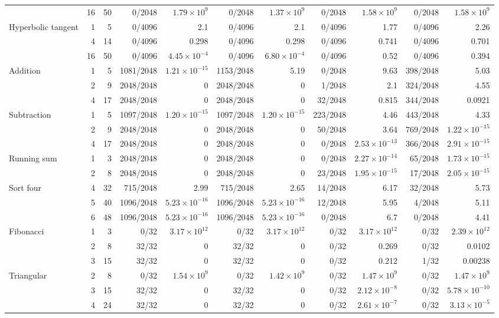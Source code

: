 \begin{table}[htbp]
{\begin{tabular}{@{}lrr *{8}{r}@{}}
 & 16 & 50 & 0/2048 & $1.79\!\times\!10^{9}$ & 0/2048 & $1.37\!\times\!10^{9}$ & 0/2048 & $1.58\!\times\!10^{9}$ & 0/2048 & $1.58\!\times\!10^{9}$ \\
Hyperbolic tangent & 1 & 5 & 0/4096 & 2.1 & 0/4096 & 2.1 & 0/4096 & 1.77 & 0/4096 & 2.26 \\
 & 4 & 14 & 0/4096 & 0.298 & 0/4096 & 0.298 & 0/4096 & 0.741 & 0/4096 & 0.701 \\
 & 16 & 50 & 0/4096 & $4.45\!\times\!10^{-4}$ & 0/4096 & $6.80\!\times\!10^{-4}$ & 0/4096 & 0.52 & 0/4096 & 0.394 \\
Addition & 1 & 5 & 1081/2048 & $1.21\!\times\!10^{-15}$ & 1153/2048 & 5.19 & 0/2048 & 9.63 & 398/2048 & 5.03 \\
 & 2 & 9 & 2048/2048 & 0 & 2048/2048 & 0 & 1/2048 & 2.1 & 324/2048 & 4.55 \\
 & 4 & 17 & 2048/2048 & 0 & 2048/2048 & 0 & 32/2048 & 0.815 & 344/2048 & 0.0921 \\
Subtraction & 1 & 5 & 1097/2048 & $1.20\!\times\!10^{-15}$ & 1097/2048 & $1.20\!\times\!10^{-15}$ & 223/2048 & 4.46 & 443/2048 & 4.33 \\
 & 2 & 9 & 2048/2048 & 0 & 2048/2048 & 0 & 50/2048 & 3.64 & 769/2048 & $1.22\!\times\!10^{-15}$ \\
 & 4 & 17 & 2048/2048 & 0 & 2048/2048 & 0 & 0/2048 & $2.53\!\times\!10^{-13}$ & 366/2048 & $2.91\!\times\!10^{-15}$ \\
Running sum & 1 & 3 & 2048/2048 & 0 & 2048/2048 & 0 & 0/2048 & $2.27\!\times\!10^{-14}$ & 65/2048 & $1.73\!\times\!10^{-15}$ \\
 & 2 & 8 & 2048/2048 & 0 & 2048/2048 & 0 & 23/2048 & $1.95\!\times\!10^{-15}$ & 17/2048 & $2.05\!\times\!10^{-15}$ \\
Sort four & 4 & 32 & 715/2048 & 2.99 & 715/2048 & 2.65 & 14/2048 & 6.17 & 32/2048 & 5.73 \\
 & 5 & 40 & 1096/2048 & $5.23\!\times\!10^{-16}$ & 1096/2048 & $5.23\!\times\!10^{-16}$ & 12/2048 & 5.95 & 4/2048 & 5.11 \\
 & 6 & 48 & 1096/2048 & $5.23\!\times\!10^{-16}$ & 1096/2048 & $5.23\!\times\!10^{-16}$ & 0/2048 & 6.7 & 0/2048 & 4.41 \\
Fibonacci & 1 & 3 & 0/32 & $3.17\!\times\!10^{12}$ & 0/32 & $3.17\!\times\!10^{12}$ & 0/32 & $3.17\!\times\!10^{12}$ & 0/32 & $2.39\!\times\!10^{12}$ \\
 & 2 & 8 & 32/32 & 0 & 32/32 & 0 & 0/32 & 0.269 & 0/32 & 0.0102 \\
 & 3 & 15 & 32/32 & 0 & 32/32 & 0 & 0/32 & 0.212 & 1/32 & 0.00238 \\
Triangular & 2 & 8 & 0/32 & $1.54\!\times\!10^{9}$ & 0/32 & $1.42\!\times\!10^{9}$ & 0/32 & $1.47\!\times\!10^{9}$ & 0/32 & $1.47\!\times\!10^{9}$ \\
 & 3 & 15 & 32/32 & 0 & 32/32 & 0 & 0/32 & $2.12\!\times\!10^{-8}$ & 0/32 & $5.78\!\times\!10^{-10}$ \\
 & 4 & 24 & 32/32 & 0 & 32/32 & 0 & 0/32 & $2.61\!\times\!10^{-7}$ & 0/32 & $3.13\!\times\!10^{-5}$ \\
\bottomrule
\end{tabular}}
\end{table}

